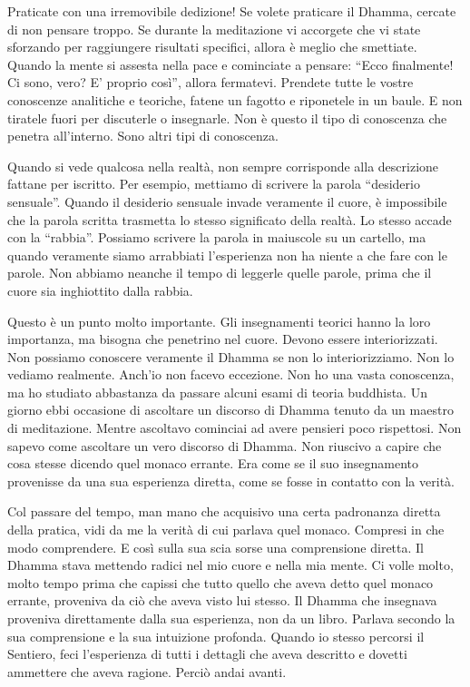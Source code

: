 Praticate con una irremovibile dedizione! Se volete praticare il Dhamma,
cercate di non pensare troppo. Se durante la meditazione vi accorgete
che vi state sforzando per raggiungere risultati specifici, allora è
meglio che smettiate. Quando la mente si assesta nella pace e cominciate
a pensare: ``Ecco finalmente! Ci sono, vero? E' proprio così'', allora
fermatevi. Prendete tutte le vostre conoscenze analitiche e teoriche,
fatene un fagotto e riponetele in un baule. E non tiratele fuori per
discuterle o insegnarle. Non è questo il tipo di conoscenza che penetra
all'interno. Sono altri tipi di conoscenza.

Quando si vede qualcosa nella realtà, non sempre corrisponde alla
descrizione fattane per iscritto. Per esempio, mettiamo di scrivere la
parola ``desiderio sensuale''. Quando il desiderio sensuale invade
veramente il cuore, è impossibile che la parola scritta trasmetta lo
stesso significato della realtà. Lo stesso accade con la ``rabbia''.
Possiamo scrivere la parola in maiuscole su un cartello, ma quando
veramente siamo arrabbiati l'esperienza non ha niente a che fare con le
parole. Non abbiamo neanche il tempo di leggerle quelle parole, prima
che il cuore sia inghiottito dalla rabbia.

Questo è un punto molto importante. Gli insegnamenti teorici hanno la
loro importanza, ma bisogna che penetrino nel cuore. Devono essere
interiorizzati. Non possiamo conoscere veramente il Dhamma se non lo
interiorizziamo. Non lo vediamo realmente. Anch'io non facevo eccezione.
Non ho una vasta conoscenza, ma ho studiato abbastanza da passare alcuni
esami di teoria buddhista. Un giorno ebbi occasione di ascoltare un
discorso di Dhamma tenuto da un maestro di meditazione. Mentre ascoltavo
cominciai ad avere pensieri poco rispettosi. Non sapevo come ascoltare
un vero discorso di Dhamma. Non riuscivo a capire che cosa stesse
dicendo quel monaco errante. Era come se il suo insegnamento provenisse
da una sua esperienza diretta, come se fosse in contatto con la verità.

Col passare del tempo, man mano che acquisivo una certa padronanza
diretta della pratica, vidi da me la verità di cui parlava quel monaco.
Compresi in che modo comprendere. E così sulla sua scia sorse una
comprensione diretta. Il Dhamma stava mettendo radici nel mio cuore e
nella mia mente. Ci volle molto, molto tempo prima che capissi che tutto
quello che aveva detto quel monaco errante, proveniva da ciò che aveva
visto lui stesso. Il Dhamma che insegnava proveniva direttamente dalla
sua esperienza, non da un libro. Parlava secondo la sua comprensione e
la sua intuizione profonda. Quando io stesso percorsi il Sentiero, feci
l'esperienza di tutti i dettagli che aveva descritto e dovetti ammettere
che aveva ragione. Perciò andai avanti.

